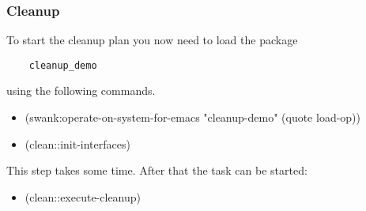 \documentclass[main.tex]{subfiles}
\begin{document}
	\subsubsection{Cleanup}
	To start the cleanup plan you now need to load the package \begin{verbatim}
	cleanup_demo
	\end{verbatim} using the following commands.
	\begin{itemize}
\item (swank:operate-on-system-for-emacs "cleanup-demo" (quote load-op))
\item (clean::init-interfaces)
\end{itemize}
This step takes some time. After that the task can be started:
\begin{itemize}
\item (clean::execute-cleanup)
\end{itemize}
\end{document}

